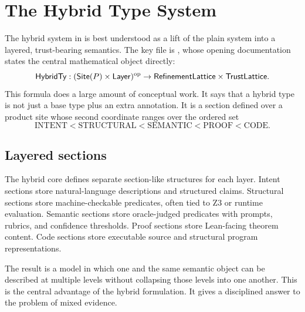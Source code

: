 \chapter{The Hybrid Type System}

The hybrid system in  is best understood as a lift of the plain
system into a layered, trust-bearing semantics. The key file is
, whose opening documentation states the central
mathematical object directly:
\[
  \mathsf{HybridTy} : (\mathsf{Site}(P) \times \mathsf{Layer})^{\mathrm{op}} \to \mathsf{RefinementLattice} \times \mathsf{TrustLattice}.
\]
This formula does a large amount of conceptual work. It says that a hybrid type is not
just a base type plus an extra annotation. It is a section defined over a product site
whose second coordinate ranges over the ordered set
\[
  \mathrm{INTENT} < \mathrm{STRUCTURAL} < \mathrm{SEMANTIC} < \mathrm{PROOF} < \mathrm{CODE}.
\]

\section*{Layered sections}
The hybrid core defines separate section-like structures for each layer. Intent sections
store natural-language descriptions and structured claims. Structural sections store
machine-checkable predicates, often tied to Z3 or runtime evaluation. Semantic sections
store oracle-judged predicates with prompts, rubrics, and confidence thresholds. Proof
sections store Lean-facing theorem content. Code sections store executable source and
structural program representations.

The result is a model in which one and the same semantic object can be described at
multiple levels without collapsing those levels into one another. This is the central
advantage of the hybrid formulation. It gives \DepPy{} a disciplined answer to the
problem of mixed evidence.

